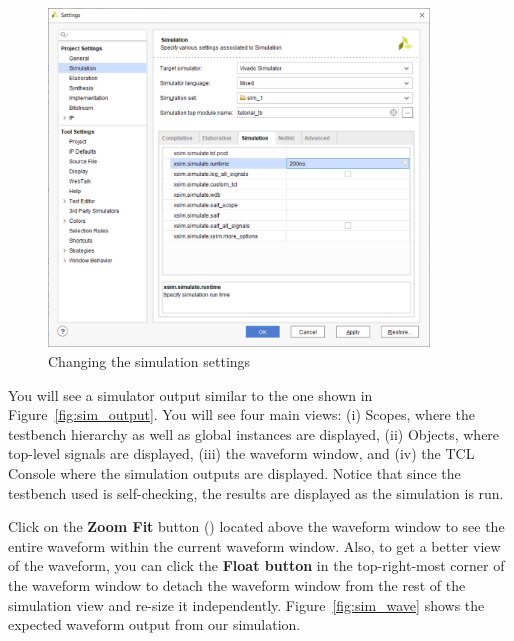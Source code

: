 \documentclass[11pt]{article}
\begin{document}
\begin{figure}[!h]
    \centering
    \includegraphics[width=0.9\textwidth]{images/sim_settings.png}
    \caption{Changing the simulation settings}
    \label{fig:sim_settings}
\end{figure}

You will see a simulator output similar to the one shown in Figure~\ref{fig:sim_output}. You will see four main views: (i) Scopes, where the testbench hierarchy as well as global instances are displayed, (ii) Objects, where top-level signals are displayed, (iii) the waveform window, and (iv) the TCL Console where the simulation outputs are displayed. Notice that since the testbench used is self-checking, the results are displayed as the simulation is run. 

Click on the \textbf{Zoom Fit} button
()
located above the waveform window to see the entire waveform within the current waveform window. Also, to get a better view of the waveform, you can click the \textbf{Float button} in the top-right-most corner of the waveform window to detach the waveform window from the rest of the simulation view and re-size it independently. Figure~\ref{fig:sim_wave} shows the expected waveform output from our simulation.
\end{document}
